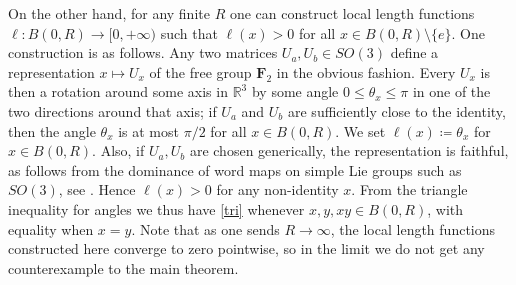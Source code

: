 \documentclass[11pt,a4paper,reqno]{amsart}
\numberwithin{equation}{section}
\theoremstyle{plain}
\theoremstyle{definition}
\newcommand\R{\mathbb{R}}
\newcommand\normsymb{\ell}  %
\newcommand\norm[1]{\ell({#1})}   %
\newcommand\free[1]{\mathbf{F}_{#1}}
\begin{document}
On the other hand, for any finite $R$ one can construct local length
functions $\normsymb: B(0,R) \to [0,+\infty)$ such that $\norm{x} > 0$
for all $x \in B(0,R) \setminus \{e\}$.  One construction is as follows.
Any two matrices $U_a, U_b\in SO(3)$ define a representation $x \mapsto
U_x$ of the free group $\free{2}$ in the obvious fashion.  Every $U_x$ is
then a rotation around some axis in $\R^3$ by some angle $0 \leq \theta_x
\leq \pi$ in one of the two directions around that axis; if $U_a$ and
$U_b$ are sufficiently close to the identity, then the angle $\theta_x$
is at most $\pi/2$ for all $x \in B(0,R)$. We set $\norm{x} \coloneqq
\theta_x$ for $x \in B(0,R)$.  Also, if $U_a,U_b$ are chosen generically,
the representation is faithful, as follows from the dominance of word
maps on simple Lie groups such as $SO(3)$, see \cite{borel}. Hence
$\norm{x}>0$ for any non-identity $x$.  From the triangle inequality for
angles we thus have \eqref{tri} whenever $x,y,xy \in B(0,R)$, with
equality when $x=y$.  Note that as one sends $R \to \infty$, the local
length functions constructed here converge to zero pointwise, so in the
limit we do not get any counterexample to the main theorem.
\end{document}
